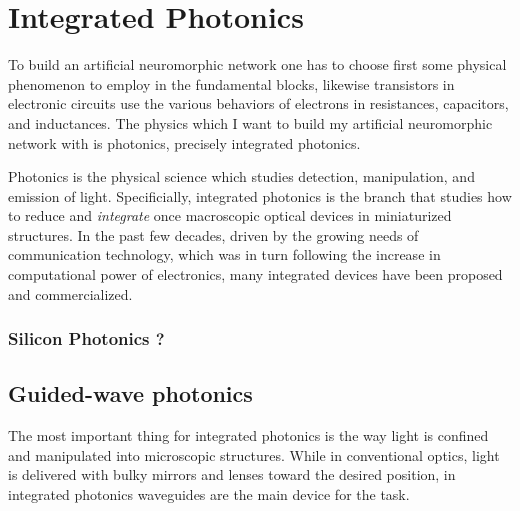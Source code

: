 \chapter{Integrated Photonics}
\label{ch:Integrated_Photonics}

To build an artificial neuromorphic network one has to choose first some physical phenomenon to employ in the fundamental blocks, likewise transistors in electronic circuits use the various behaviors of electrons in resistances, capacitors, and inductances.
The physics which I want to build my artificial neuromorphic network with is photonics, precisely integrated photonics.

Photonics is the physical science which studies detection, manipulation, and emission of light.
Specificially, integrated photonics is the branch that studies how to reduce and \textit{integrate} once macroscopic optical devices in miniaturized structures.
In the past few decades, driven by the growing needs of communication technology, which was in turn following the increase in computational power of electronics, many integrated devices have been proposed and commercialized.


\subsection{Silicon Photonics ?}


\section{Guided-wave photonics}
\label{sec:guided-wave_photonics}
The most important thing for integrated photonics is the way light is confined and manipulated into microscopic structures.
While in conventional optics, light is delivered with bulky mirrors and lenses toward the desired position, in integrated photonics waveguides are the main device for the task.

